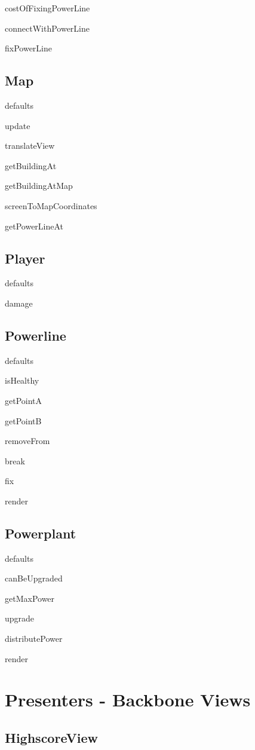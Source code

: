 	costOfFixingPowerLine

	connectWithPowerLine

	fixPowerLine

\subsection*{Map}

	defaults

	update

	translateView

	getBuildingAt

	getBuildingAtMap

	screenToMapCoordinates

	getPowerLineAt

\subsection*{Player}

	defaults

	damage

\subsection*{Powerline}

	defaults

	isHealthy

	getPointA

	getPointB

	removeFrom

	break

	fix

	render

\subsection*{Powerplant}

	defaults

	canBeUpgraded

	getMaxPower

	upgrade

	distributePower

	render


\clearpage

\section{Presenters - Backbone Views}
	
	\subsection*{HighscoreView}

